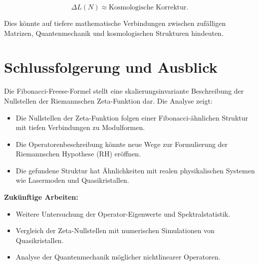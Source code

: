 \documentclass[a4paper,12pt]{article}
\begin{document}
\begin{equation}
    \Delta L(N) \approx \text{Kosmologische Korrektur}.
\end{equation}

Dies könnte auf tiefere mathematische Verbindungen zwischen zufälligen Matrizen, Quantenmechanik und kosmologischen Strukturen hindeuten.

\section{Schlussfolgerung und Ausblick}
Die Fibonacci-Freese-Formel stellt eine skalierungsinvariante Beschreibung der Nullstellen der Riemannschen Zeta-Funktion dar. Die Analyse zeigt:

\begin{itemize}
    \item Die Nullstellen der Zeta-Funktion folgen einer Fibonacci-ähnlichen Struktur mit tiefen Verbindungen zu Modulformen.
    \item Die Operatorenbeschreibung könnte neue Wege zur Formulierung der Riemannschen Hypothese (RH) eröffnen.
    \item Die gefundene Struktur hat Ähnlichkeiten mit realen physikalischen Systemen wie Lasermoden und Quasikristallen.
\end{itemize}

\textbf{Zukünftige Arbeiten:}
\begin{itemize}
    \item Weitere Untersuchung der Operator-Eigenwerte und Spektralstatistik.
    \item Vergleich der Zeta-Nullstellen mit numerischen Simulationen von Quasikristallen.
    \item Analyse der Quantenmechanik möglicher nichtlinearer Operatoren.
\end{itemize}
\end{document}
